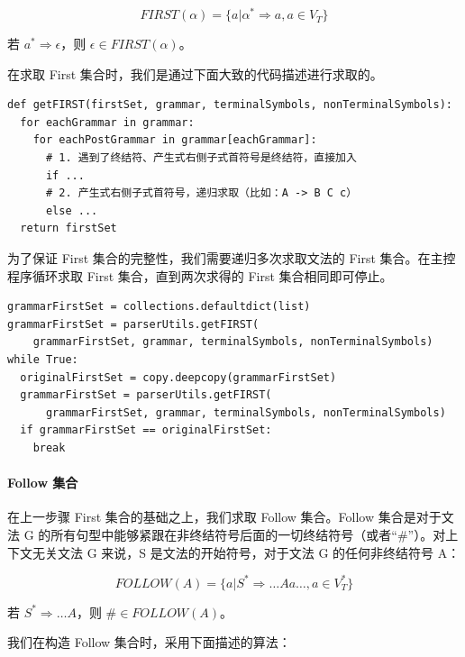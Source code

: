 \documentclass[UTF8]{ctexart}
\begin{document}
\begin{equation}
  FIRST(\alpha) = \{a | \alpha^* \Rightarrow a, a \in V_T\}
\end{equation}

若 $a^* \Rightarrow \epsilon$，则 $\epsilon \in FIRST(\alpha)$。

在求取 First 集合时，我们是通过下面大致的代码描述进行求取的。

\begin{verbatim}
def getFIRST(firstSet, grammar, terminalSymbols, nonTerminalSymbols):
  for eachGrammar in grammar:
    for eachPostGrammar in grammar[eachGrammar]:
      # 1. 遇到了终结符、产生式右侧子式首符号是终结符，直接加入
      if ...
      # 2. 产生式右侧子式首符号，递归求取（比如：A -> B C c）
      else ...
  return firstSet
\end{verbatim}

为了保证 First 集合的完整性，我们需要递归多次求取文法的 First 集合。在主控程序循环求取 First 集合，直到两次求得的 First 集合相同即可停止。

\begin{verbatim}
grammarFirstSet = collections.defaultdict(list)
grammarFirstSet = parserUtils.getFIRST(
    grammarFirstSet, grammar, terminalSymbols, nonTerminalSymbols)
while True:
  originalFirstSet = copy.deepcopy(grammarFirstSet)
  grammarFirstSet = parserUtils.getFIRST(
      grammarFirstSet, grammar, terminalSymbols, nonTerminalSymbols)
  if grammarFirstSet == originalFirstSet:
    break
\end{verbatim}

\paragraph{Follow 集合}
在上一步骤 First 集合的基础之上，我们求取 Follow 集合。Follow 集合是对于文法 G 的所有句型中能够紧跟在非终结符号后面的一切终结符号（或者“\#”）。对上下文无关文法 G 来说，S 是文法的开始符号，对于文法 G 的任何非终结符号 A：

\begin{equation}
  FOLLOW(A) = \{ a | S^* \Rightarrow \dots Aa \dots, a \in V_T^* \}
\end{equation}

若 $S^* \Rightarrow \dots A$，则 $\# \in FOLLOW(A)$。

我们在构造 Follow 集合时，采用下面描述的算法：

\noindent{}
\end{document}

